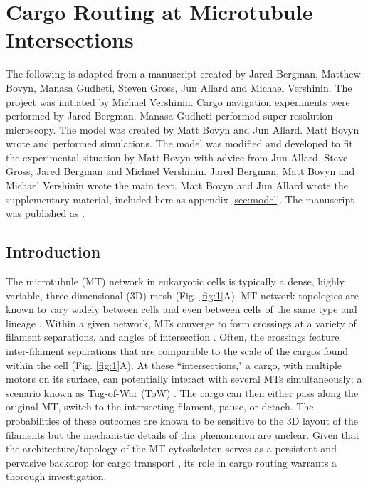 \chapter{Cargo Routing at Microtubule Intersections} \label{sec:maintext}

The following is adapted from a manuscript created by Jared Bergman, Matthew Bovyn, Manasa Gudheti, Steven Gross, Jun Allard and Michael Vershinin. The project was initiated by Michael Vershinin. Cargo navigation experiments were performed by Jared Bergman. Manasa Gudheti performed super-resolution microscopy. The model was created by Matt Bovyn and Jun Allard. Matt Bovyn wrote and performed simulations. The model was modified and developed to fit the experimental situation by Matt Bovyn with advice from Jun Allard, Steve Gross, Jared Bergman and Michael Vershinin. Jared Bergman, Matt Bovyn and Michael Vershinin wrote the main text. Matt Bovyn  and Jun Allard wrote the supplementary material, included here as appendix \ref{sec:model}. The manuscript was published as \cite{Bergman2018}.

\section{Introduction}

The microtubule (MT) network in eukaryotic cells is typically a dense, highly variable, three-dimensional (3D) mesh (Fig. \ref{fig:1}A). MT network topologies are known to vary widely between cells \cite{Schnorrenberg2016} and even between cells of the same type and lineage \cite{Dong2015}. Within a given network, MTs converge to form crossings at a variety of filament separations, and angles of intersection \cite{Huang2008}. Often, the crossings feature inter-filament separations that are comparable to the scale of the cargos found within the cell (Fig. \ref{fig:1}A). At these ``intersections," a cargo, with multiple motors on its surface, can potentially interact with several MTs simultaneously; a scenario known as Tug-of-War (ToW) \cite{Muller2008,Osunbayo2015}. The cargo can then either pass along the original MT, switch to the intersecting filament, pause, or detach. The probabilities of these outcomes are known to be sensitive to the 3D layout of the filaments \cite{Balint2013,Ross2008,Erickson2013} but the mechanistic details of this phenomenon are unclear. Given that the architecture/topology of the MT cytoskeleton serves as a persistent and pervasive backdrop for cargo transport \cite{Verdeny-Vilanova2017}, its role in cargo routing warrants a thorough investigation.

